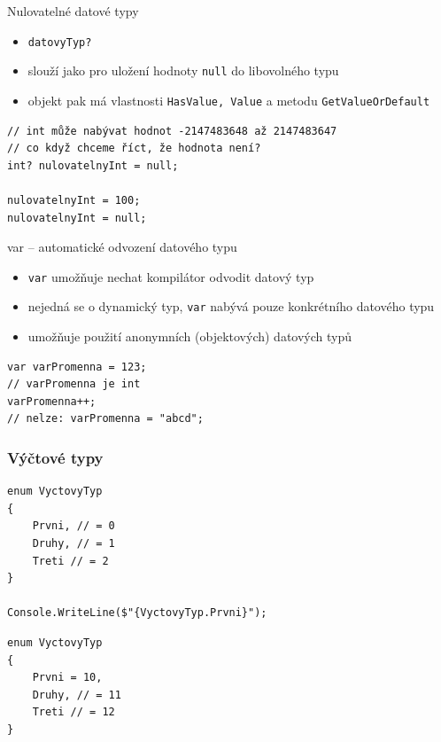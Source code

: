 \begin{frame}[fragile]
\vfill
\begin{block}{Nulovatelné datové typy}
\begin{itemize}
\item \lstinline|datovyTyp?|
\item slouží jako  pro uložení hodnoty \lstinline|null| do libovolného typu
\item objekt pak má vlastnosti \lstinline|HasValue, Value| a metodu \lstinline|GetValueOrDefault|
\end{itemize}
\end{block}
\vfill
\begin{yesblock}
\begin{lstlisting}
// int může nabývat hodnot -2147483648 až 2147483647
// co když chceme říct, že hodnota není?
int? nulovatelnyInt = null;

nulovatelnyInt = 100;
nulovatelnyInt = null;

\end{lstlisting}
\end{yesblock}
\vfill
\end{frame}




\begin{frame}[fragile]
\vfill
\begin{block}{var -- automatické odvození datového typu}
\begin{itemize}
\item \lstinline|var| umožňuje nechat kompilátor odvodit datový typ
\item nejedná se o dynamický typ, \lstinline|var| nabývá pouze konkrétního datového typu
\item umožňuje použití anonymních (objektových) datových typů 
\end{itemize}
\end{block}
\vfill
\begin{yesblock}
\begin{lstlisting}
var varPromenna = 123;
// varPromenna je int
varPromenna++;
// nelze: varPromenna = "abcd";
\end{lstlisting}
\end{yesblock}
\vfill
\end{frame}


\begin{frame}[fragile]
\frametitle{Výčtové typy}
\vfill
\begin{yesblock}
\begin{lstlisting}
enum VyctovyTyp
{
    Prvni, // = 0
    Druhy, // = 1
    Treti // = 2
}

Console.WriteLine($"{VyctovyTyp.Prvni}");
\end{lstlisting}
\end{yesblock}
\vfill
\begin{yesblock}
\begin{lstlisting}
enum VyctovyTyp
{
    Prvni = 10,
    Druhy, // = 11
    Treti // = 12
}
\end{lstlisting}
\end{yesblock}
\vfill
\end{frame}


